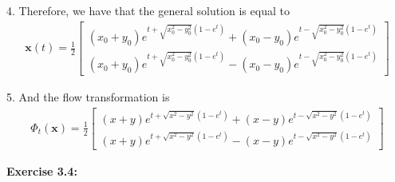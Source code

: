 \documentclass[12pt]{article}
\begin{document}
\begin{enumerate}
        4. Therefore, we have that the general solution is equal to
        \begin{align*}
          \mathbf{x}(t) = \frac{1}{2} \begin{bmatrix}   (x_0 + y_0)e^{t+\sqrt{x_0^2-y_0^2}(1-e^t)} + (x_0 - y_0)e^{t-\sqrt{x_0^2-y_0^2}(1-e^t)} \\ (x_0 + y_0)e^{t+\sqrt{x_0^2-y_0^2}(1-e^t)} - (x_0 - y_0)e^{t-\sqrt{x_0^2-y_0^2}(1-e^t)}\end{bmatrix}
        \end{align*}

        5. And the flow transformation is
        \begin{align*}
          \Phi_t(\mathbf{x}) =  \frac{1}{2} \begin{bmatrix}   (x + y)e^{t+\sqrt{x^2-y^2}(1-e^t)} + (x - y)e^{t-\sqrt{x^2-y^2}(1-e^t)} \\ (x + y)e^{t+\sqrt{x^2-y^2}(1-e^t)} - (x - y)e^{t-\sqrt{x^2-y^2}(1-e^t)}\end{bmatrix}
        \end{align*}

\end{enumerate}

\noindent \textbf{Exercise 3.4:}
\end{document}
